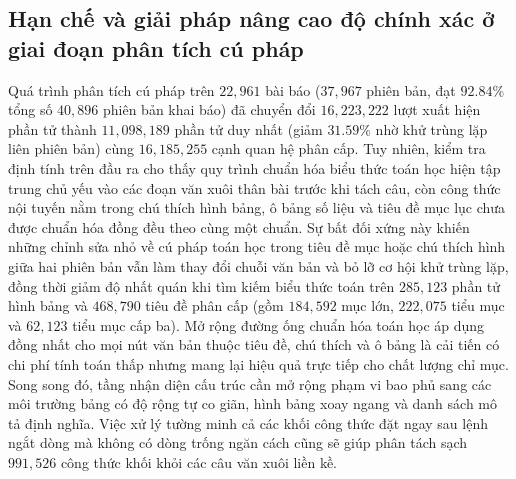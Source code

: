 \subsection{Hạn chế và giải pháp nâng cao độ chính xác ở giai đoạn phân tích cú pháp}

Quá trình phân tích cú pháp trên $22{,}961$ bài báo ($37{,}967$ phiên bản, đạt $92.84\%$ tổng số $40{,}896$ phiên bản khai báo) đã chuyển đổi $16{,}223{,}222$ lượt xuất hiện phần tử thành $11{,}098{,}189$ phần tử duy nhất (giảm $31.59\%$ nhờ khử trùng lặp liên phiên bản) cùng $16{,}185{,}255$ cạnh quan hệ phân cấp. Tuy nhiên, kiểm tra định tính trên đầu ra cho thấy quy trình chuẩn hóa biểu thức toán học hiện tập trung chủ yếu vào các đoạn văn xuôi thân bài trước khi tách câu, còn công thức nội tuyến nằm trong chú thích hình bảng, ô bảng số liệu và tiêu đề mục lục chưa được chuẩn hóa đồng đều theo cùng một chuẩn. Sự bất đối xứng này khiến những chỉnh sửa nhỏ về cú pháp toán học trong tiêu đề mục hoặc chú thích hình giữa hai phiên bản vẫn làm thay đổi chuỗi văn bản và bỏ lỡ cơ hội khử trùng lặp, đồng thời giảm độ nhất quán khi tìm kiếm biểu thức toán trên $285{,}123$ phần tử hình bảng và $468{,}790$ tiêu đề phân cấp (gồm $184{,}592$ mục lớn, $222{,}075$ tiểu mục và $62{,}123$ tiểu mục cấp ba). Mở rộng đường ống chuẩn hóa toán học áp dụng đồng nhất cho mọi nút văn bản thuộc tiêu đề, chú thích và ô bảng là cải tiến có chi phí tính toán thấp nhưng mang lại hiệu quả trực tiếp cho chất lượng chỉ mục. Song song đó, tầng nhận diện cấu trúc cần mở rộng phạm vi bao phủ sang các môi trường bảng có độ rộng tự co giãn, hình bảng xoay ngang và danh sách mô tả định nghĩa. Việc xử lý tường minh cả các khối công thức đặt ngay sau lệnh ngắt dòng mà không có dòng trống ngăn cách cũng sẽ giúp phân tách sạch $991{,}526$ công thức khối khỏi các câu văn xuôi liền kề.

